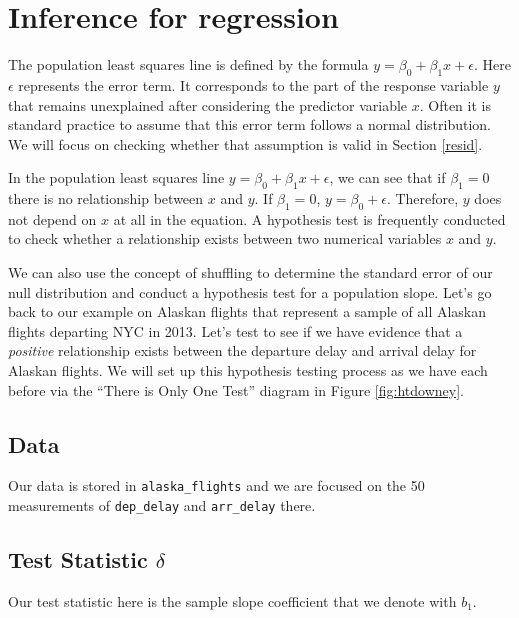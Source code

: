 \documentclass[]{tufte-book}
\begin{document}
\section{Inference for regression}\label{inference-for-regression}

The population least squares line is defined by the formula
\(y = \beta_0 + \beta_1 x + \epsilon\). Here \(\epsilon\) represents the
error term. It corresponds to the part of the response variable \(y\)
that remains unexplained after considering the predictor variable \(x\).
Often it is standard practice to assume that this error term follows a
normal distribution. We will focus on checking whether that assumption
is valid in Section \ref{resid}.

In the population least squares line
\(y = \beta_0 + \beta_1 x + \epsilon\), we can see that if
\(\beta_1 = 0\) there is no relationship between \(x\) and \(y\). If
\(\beta_1 = 0\), \(y = \beta_0 + \epsilon\). Therefore, \(y\) does not
depend on \(x\) at all in the equation. A hypothesis test is frequently
conducted to check whether a relationship exists between two numerical
variables \(x\) and \(y\).

We can also use the concept of shuffling to determine the standard error
of our null distribution and conduct a hypothesis test for a population
slope. Let's go back to our example on Alaskan flights that represent a
sample of all Alaskan flights departing NYC in 2013. Let's test to see
if we have evidence that a \emph{positive} relationship exists between
the departure delay and arrival delay for Alaskan flights. We will set
up this hypothesis testing process as we have each before via the
``There is Only One Test'' diagram in Figure \ref{fig:htdowney}.

\subsection{Data}\label{data-2}

Our data is stored in \texttt{alaska\_flights} and we are focused on the
50 measurements of \texttt{dep\_delay} and \texttt{arr\_delay} there.

\subsection{\texorpdfstring{Test Statistic
\(\delta\)}{Test Statistic \textbackslash{}delta}}\label{test-statistic-delta-2}

Our test statistic here is the sample slope coefficient that we denote
with \(b_1\).
\end{document}
